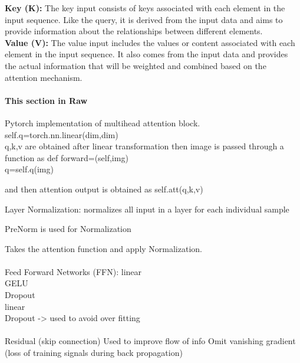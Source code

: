 \textbf{Key (K):} The key input consists of keys associated with each element in the input sequence. Like the query, it is derived from the input data and aims to provide information about the relationships between different elements.\\

\textbf{Value (V):} The value input includes the values or content associated with each element in the input sequence. It also comes from the input data and provides the actual information that will be weighted and combined based on the attention mechanism.\\


\paragraph*{This section in Raw}
Pytorch implementation of multihead attention block.
self.q=torch.nn.linear(dim,dim)\\
q,k,v are obtained after linear transformation
then image is passed through a function as 
def forward=(self,img)\\
q=self.q(img)

and then attention output is obtained as self.att(q,k,v)

Layer Normalization: normalizes all input in a layer for each individual sample

PreNorm is used for Normalization

Takes the attention function and apply Normalization.\\
\\

Feed Forward  Networks (FFN):
linear\\
GELU\\
Dropout\\
linear\\
Dropout -> used to avoid over fitting\\
\\
Residual (skip connection)
Used to improve flow of info 
Omit vanishing gradient (loss of training signals during back propagation)





\newpage